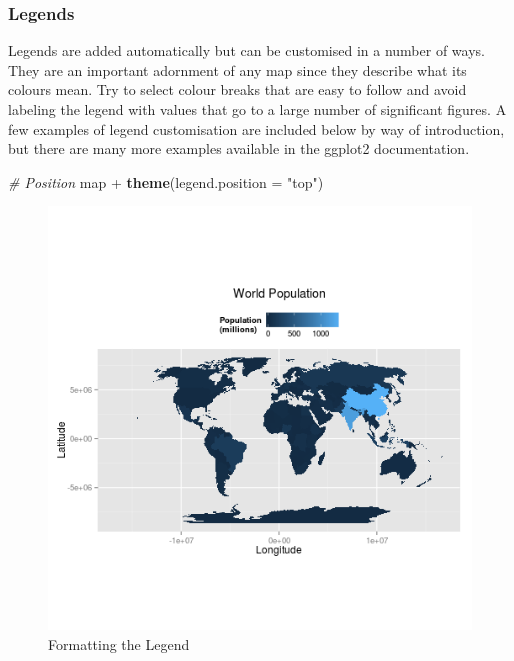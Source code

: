 \documentclass[]{article}
\newenvironment{Shaded}{}{}
\newcommand{\KeywordTok}[1]{\textcolor[rgb]{0.00,0.44,0.13}{\textbf{{#1}}}}
\newcommand{\DataTypeTok}[1]{\textcolor[rgb]{0.56,0.13,0.00}{{#1}}}
\newcommand{\StringTok}[1]{\textcolor[rgb]{0.25,0.44,0.63}{{#1}}}
\newcommand{\CommentTok}[1]{\textcolor[rgb]{0.38,0.63,0.69}{\textit{{#1}}}}
\newcommand{\NormalTok}[1]{{#1}}
\begin{document}
\subsubsection{Legends}\label{legends}

Legends are added automatically but can be customised in a number of
ways. They are an important adornment of any map since they describe
what its colours mean. Try to select colour breaks that are easy to
follow and avoid labeling the legend with values that go to a large
number of significant figures. A few examples of legend customisation
are included below by way of introduction, but there are many more
examples available in the ggplot2 documentation.

\begin{Shaded}
\begin{Highlighting}[]
\CommentTok{# Position}
\NormalTok{map +}\StringTok{ }\KeywordTok{theme}\NormalTok{(}\DataTypeTok{legend.position =} \StringTok{"top"}\NormalTok{)}
\end{Highlighting}
\end{Shaded}

\begin{figure}[htbp]
\centering
\includegraphics{figure/Formatting_the_Legend.png}
\caption{Formatting the Legend}
\end{figure}
\end{document}
